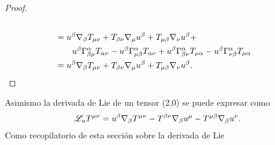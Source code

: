 \begin{proof}
\begin{equation}
\begin{aligned}
{\begin{array}{l}
                                                                                                                                                                                                                                                                     \end{array}}                                                                                                  \\
                                       & =  u^\beta \mathbf{\nabla}_\beta T_{\mu \nu}+T_{\beta \nu}\mathbf{\nabla}_\mu u^\beta +T_{\mu \beta } \mathbf{\nabla}_\nu u^\beta +                                                                                                                                                                                                                  \\
        &\qquad u^\beta \Gamma_{\beta \mu}^\alpha T_{\alpha \nu}-u^\beta \Gamma^\alpha_{\mu \beta}T_{\alpha \nu} + u^\beta \Gamma_{\beta \nu}^\alpha T_{\mu \alpha}- u^\beta \Gamma^\alpha_{\nu \beta}T_{\mu \alpha }                                                                                                                                                                     \\
                                       & = u^\beta \mathbf{\nabla}_\beta T_{\mu \nu}+T_{\beta \nu}\mathbf{\nabla}_\mu u^\beta +T_{\mu \beta } \mathbf{\nabla}_\nu u^\beta.
     \end{aligned}
 \end{equation}
\end{proof}
\noindent Asimismo la derivada de Lie de un tensor (2,0) se puede expresar como
\begin{equation}
    \mathscr{L}_u T^{\mu \nu} = u^\beta \mathbf{\nabla}_\beta T^{\mu \nu}-T^{\beta \nu}\mathbf{\nabla}_\beta u^\mu - T^{\mu \beta } \mathbf{\nabla}_\beta u^\nu.
\end{equation}
Como recopilatorio de esta sección sobre la derivada de Lie


